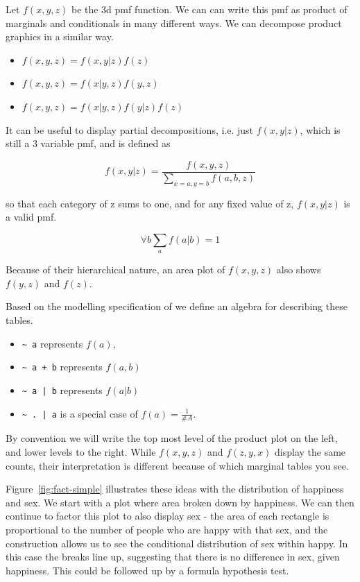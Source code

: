 \documentclass[letterpaper,oneside]{scrartcl}
\begin{document}
Let $f(x, y, z)$ be the 3d pmf function. We can can write this pmf as product of marginals and conditionals in many different ways.  We can decompose product graphics in a similar way.

\begin{itemize}
  \item $f(x, y, z) = f(x, y | z) f(z)$
  \item $f(x, y, z) = f(x | y, z) f(y, z)$
  \item $f(x, y, z) = f(x | y, z) f(y | z) f(z)$
\end{itemize}

It can be useful to display partial decompositions, i.e. just $f(x, y | z)$, which is still a 3 variable pmf, and is defined as 

\[ f(x, y | z) = \frac{f(x, y, z)}{\sum_{x = a, y = b} f(a, b, z)} \]

so that each category of z sums to one, and for any fixed value of z, $f(x, y | z)$ is a valid pmf.

\[ \forall b \sum_a f(a | b) = 1 \]

Because of their hierarchical nature, an area plot of $f(x, y, z)$ also shows $f(y, z)$ and $f(z)$.  

Based on the modelling specification of \citet{wilkinson:1973} we define an algebra for describing these tables.  

\begin{itemize}
  \item \verb|~ a| represents $f(a)$,
  \item \verb|~ a + b| represents $f(a, b)$
  \item \verb!~ a | b! represents $f(a | b)$
  \item \verb!~ . | a! is a special case of $f(a) = \frac{1}{\#A}$. 
\end{itemize}

By convention we will write the top most level of the product plot on the left, and lower levels to the right.  While $f(x, y, z)$ and $f(z, y, x)$ display the same counts, their interpretation is different because of which marginal tables you see.

Figure~\ref{fig:fact-simple} illustrates these ideas with the distribution of happiness and sex. We start with a plot where area broken down by happiness. We can then continue to factor this plot to also display sex - the area of each rectangle is proportional to the number of people who are happy with that sex, and the construction allows us to see the conditional distribution of sex within happy. In this case the breaks line up, suggesting that there is no difference in sex, given happiness.  This could be followed up by a formula hypothesis test.
\end{document}
